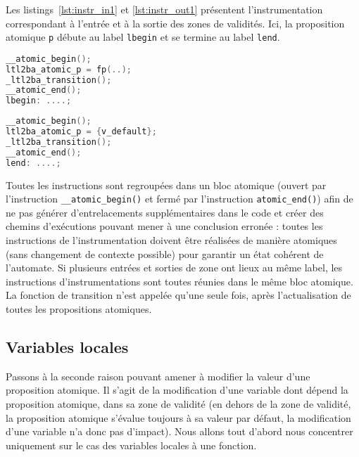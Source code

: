 Les listings~\ref{lst:instr_in1} et \ref{lst:instr_out1} présentent
l'instrumentation correspondant à l'entrée et à la sortie des zones de
validités. Ici, la proposition atomique \texttt{p} débute au label
\texttt{lbegin} et se termine au label \texttt{lend}.

\noindent\begin{minipage}{.45\textwidth}
  \begin{lstlisting}[language=C, frame=single, caption=Entrée de zone de
    validité (1),
    label=lst:instr_in1]
__atomic_begin();
ltl2ba_atomic_p = fp(..);
_ltl2ba_transition();
__atomic_end();
lbegin: ....;
\end{lstlisting}
\end{minipage}\hfill
\begin{minipage}{.45\textwidth}
  \begin{lstlisting}[language=C, frame=single, caption=Sortie de zone de
    validité (1),
    label=lst:instr_out1]
__atomic_begin();
ltl2ba_atomic_p = {v_default};
_ltl2ba_transition();
__atomic_end();
lend: ....;
\end{lstlisting}
\end{minipage}

Toutes les instructions sont regroupées dans un bloc atomique (ouvert
par l'instruction \texttt{\_\_atomic\_begin()} et fermé par
l'instruction \texttt{atomic\_end()}) afin de ne pas générer
d'entrelacements supplémentaires dans le code et créer des chemins
d'exécutions pouvant mener à une conclusion erronée : toutes les
instructions de l'instrumentation doivent être réalisées de manière
atomiques (sans changement de contexte possible) pour garantir un état
cohérent de l'automate. Si plusieurs entrées et sorties de zone ont
lieux au même label, les instructions d'instrumentations sont toutes
réunies dans le même bloc atomique. La fonction de transition n'est
appelée qu'une seule fois, après l'actualisation de toutes les
propositions atomiques.

\subsection{Variables locales}

Passons à la seconde raison pouvant amener à modifier la valeur d'une
proposition atomique. Il s'agit de la modification d'une variable dont
dépend la proposition atomique, dans sa zone de validité (en dehors de
la zone de validité, la proposition atomique s'évalue toujours à sa
valeur par défaut, la modification d'une variable n'a donc pas
d'impact). Nous allons tout d'abord nous concentrer uniquement sur le
cas des variables locales à une fonction.

